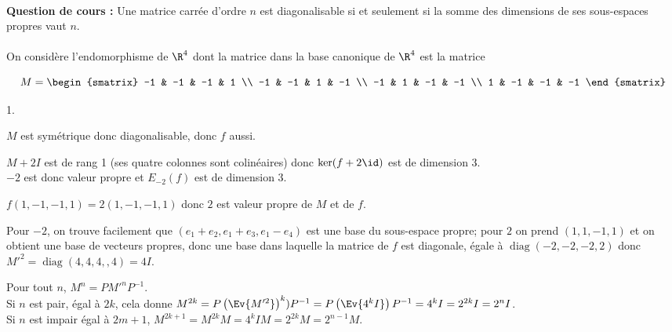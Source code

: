 \documentclass[11pt]{article}%
\begin{document}
 \newpage

 \begin{exercice} \indent \\
 \textbf{Question de cours :} Une matrice carrée d'ordre $n$ est
diagonalisable si et seulement si la somme des dimensions de ses
sous-espaces propres vaut $n$.
 \\
\\
 On considère l'endomorphisme de $\R^{4}$ dont la matrice dans la
 base canonique de $\R^{4}$ est la matrice 
 
\[
 M = \begin{smatrix}
 -1 & -1 & -1 & 1 \\
 -1 & -1 & 1 & -1 \\
 -1 & 1 & -1 & -1 \\
 1 & -1 & -1 & -1
\end{smatrix}
\]


 \begin{noliste}{1.}
 \setlength{\itemsep}{4mm}
 \item $M$ est symétrique donc diagonalisable, donc $f$ aussi. \\

 \item $M + 2 I$ est de rang 1 (ses quatre colonnes sont colinéaires)
donc $\ker ( f + 2 \id)$ est de dimension 3. \\
 $-2$ est donc valeur propre et $E_{-2} (f)$ est de dimension 3. \\

 \item $f\left( 1,-1,-1,1\right) = 2 ( 1, -1, -1, 1)$ donc $2$ est
valeur propre de $M$ et de $f$. \\

 \item Pour $-2$, on trouve facilement que $(e_{1} + e_{2}, e_{1} +
e_{3}, e_{1} - e_{4})$ est une base du sous-espace propre; pour $2$ on
prend $(1, 1, -1, 1)$ et on obtient une base de vecteurs propres, donc
une base dans laquelle la matrice de $f$ est diagonale, égale à
$\operatorname{diag} (-2, -2, -2, 2)$ donc $M'^{2} =
\operatorname{diag}( 4, 4, 4,,4 ) = 4 I$. \\

 \item Pour tout $n$, $M^{n} = P M'^{n} P^{-1}$. \\
 Si $n$ est pair, égal à $2k$, cela donne $M^{2k} = P \left(\Ev{ M'^{2}
}\right)^{k} ) P^{-1} = P \left(\Ev{ 4^{k} I }\right) P^{-1} = 4^{k} I
= 2^{2k} I = 2^{n} I$. \\
 Si $n$ est impair égal à $2m + 1$, $M^{2k + 1} = M^{2k} M = 4^{k} I M
= 2^{2k} M = 2^{n-1} M$. \\


\end{noliste}
\end{exercice}
\end{document}
